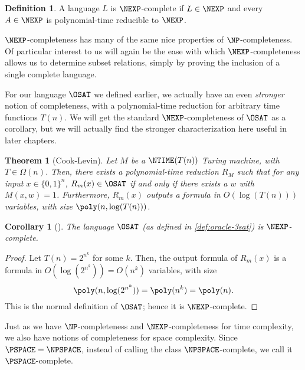 \documentclass[english,12pt]{reedthesis}
\theoremstyle{plain}
\newtheorem{thm}{Theorem}[section]
\newtheorem{cor}[cor]{Corollary}
\theoremstyle{definition}
\newtheorem{defn}[defn]{Definition}
\theoremstyle{remark}
\begin{document}
\begin{defn}\label{def:nexp-complete}
  A language $L$ is $\NEXP$-complete if $L \in \NEXP$ and every $A \in \NEXP$ is
  polynomial-time reducible to $\NEXP$.
\end{defn}

$\NEXP$-completeness has many of the same nice properties of $\NP$-completeness.
Of particular interest to us will again be the ease with which
$\NEXP$-completeness allows us to determine subset relations, simply by proving
the inclusion of a single complete language.

For our language $\OSAT$ we defined earlier, we actually have an even
\emph{stronger} notion of completeness, with a polynomial-time reduction for
arbitrary time functions $T(n)$. We will get the standard $\NEXP$-completeness
of $\OSAT$ as a corollary, but we will actually find the stronger
characterization here useful in later chapters.

\begin{thm}[{Cook-Levin}]\label{thm:cook-levin-general}
  Let $M$ be a $\NTIME(T(n))$ Turing machine, with $T \in \Omega(n)$. Then, there
  exists a polynomial-time reduction $R_{M}$ such that for any input
  $x \in \{0, 1\}^{n}$, $R_{m}(x) \in \OSAT$ if and only if there exists a $w$ with
  $M(x, w) = 1$. Furthermore, $R_{m}(x)$ outputs a formula in $O(\log(T(n)))$
  variables, with size $\poly(n, \log(T(n)))$.
\end{thm}

\begin{cor}[{\cite[Proposition 4.2]{BFL90}}]\label{thm:o3sat-nexp-complete}
  The language $\OSAT$ (as defined in \cref{def:oracle-3sat}) is
  $\NEXP$-complete.
\end{cor}

\begin{proof}
  Let $T(n) = 2^{n^{k}}$ for some $k$. Then, the output formula of $R_{m}(x)$ is
  a formula in $O(\log(2^{n^{k}})) = O(n^{k})$ variables, with size
  \begin{equation}
    \poly(n, \log(2^{n^{k}})) = \poly(n^{k}) = \poly(n).
  \end{equation}
  This is the normal definition of $\OSAT$; hence it is $\NEXP$-complete.
\end{proof}

Just as we have $\NP$-completeness and $\NEXP$-completeness for time complexity,
we also have notions of completeness for space complexity. Since
$\PSPACE = \NPSPACE$, instead of calling the class $\NPSPACE$-complete, we call
it $\PSPACE$-complete.
\end{document}
